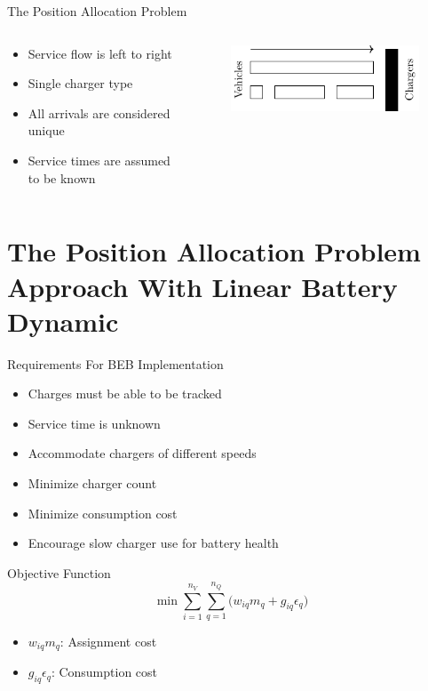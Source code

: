 \documentclass[aspectratio=169]{beamer}
\begin{document}
\begin{frame}[label={sec:org211e9ec}]{The Position Allocation Problem}
\begin{columns}
\begin{column}{0.5\columnwidth}
\begin{itemize}
\item Service flow is left to right
\item Single charger type
\item All arrivals are considered unique
\item Service times are assumed to be known
\end{itemize}
\end{column}

\begin{column}{0.5\columnwidth}
\begin{figure}[htpb]
\centering
    \includegraphics{img/pap}
    \label{subfig:papexample}
\end{figure}
\end{column}
\end{columns}
\end{frame}

\section{The Position Allocation Problem Approach With Linear Battery Dynamic}
\label{sec:org2414ef1}
\begin{frame}[label={sec:org146f773}]{Requirements For BEB Implementation}
\begin{itemize}
\item Charges must be able to be tracked
\item Service time is unknown
\item Accommodate chargers of different speeds
\item Minimize charger count
\item Minimize consumption cost
\item Encourage slow charger use for battery health
\end{itemize}
\end{frame}

\begin{frame}[label={sec:orgab8250e}]{Objective Function}
\begin{equation*}
\label{eq:objective}
	\min \sum_{i=1}^{n_V} \sum_{q=1}^{n_Q} \Big( w_{iq} m_q + g_{iq} \epsilon_q \Big)
\end{equation*}

\begin{itemize}
\item \(w_{iq} m_q\): Assignment cost
\item \(g_{iq} \epsilon_q\): Consumption cost
\end{itemize}
\end{frame}
\end{document}
